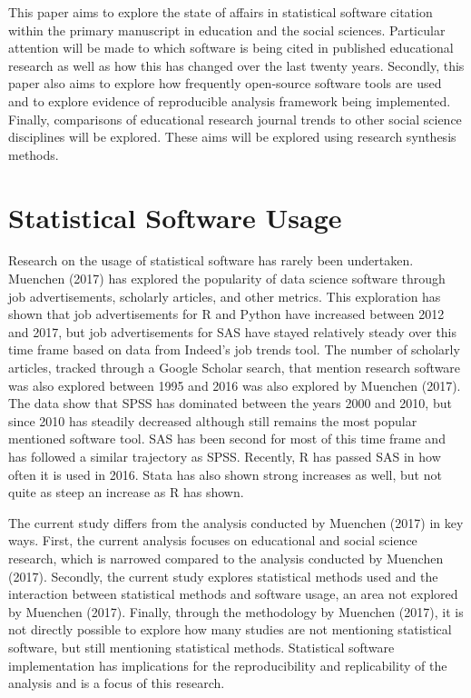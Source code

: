 \documentclass[
  english,
  ,man]{apa7}
\begin{document}
This paper aims to explore the state of affairs in statistical software citation within the primary manuscript in education and the social sciences. Particular attention will be made to which software is being cited in published educational research as well as how this has changed over the last twenty years. Secondly, this paper also aims to explore how frequently open-source software tools are used and to explore evidence of reproducible analysis framework being implemented. Finally, comparisons of educational research journal trends to other social science disciplines will be explored. These aims will be explored using research synthesis methods.

\hypertarget{statistical-software-usage}{%
\section{Statistical Software Usage}\label{statistical-software-usage}}

Research on the usage of statistical software has rarely been undertaken. Muenchen (2017) has explored the popularity of data science software through job advertisements, scholarly articles, and other metrics. This exploration has shown that job advertisements for R and Python have increased between 2012 and 2017, but job advertisements for SAS have stayed relatively steady over this time frame based on data from Indeed's job trends tool. The number of scholarly articles, tracked through a Google Scholar search, that mention research software was also explored between 1995 and 2016 was also explored by Muenchen (2017). The data show that SPSS has dominated between the years 2000 and 2010, but since 2010 has steadily decreased although still remains the most popular mentioned software tool. SAS has been second for most of this time frame and has followed a similar trajectory as SPSS. Recently, R has passed SAS in how often it is used in 2016. Stata has also shown strong increases as well, but not quite as steep an increase as R has shown.

The current study differs from the analysis conducted by Muenchen (2017) in key ways. First, the current analysis focuses on educational and social science research, which is narrowed compared to the analysis conducted by Muenchen (2017). Secondly, the current study explores statistical methods used and the interaction between statistical methods and software usage, an area not explored by Muenchen (2017). Finally, through the methodology by Muenchen (2017), it is not directly possible to explore how many studies are not mentioning statistical software, but still mentioning statistical methods. Statistical software implementation has implications for the reproducibility and replicability of the analysis and is a focus of this research.
\end{document}
